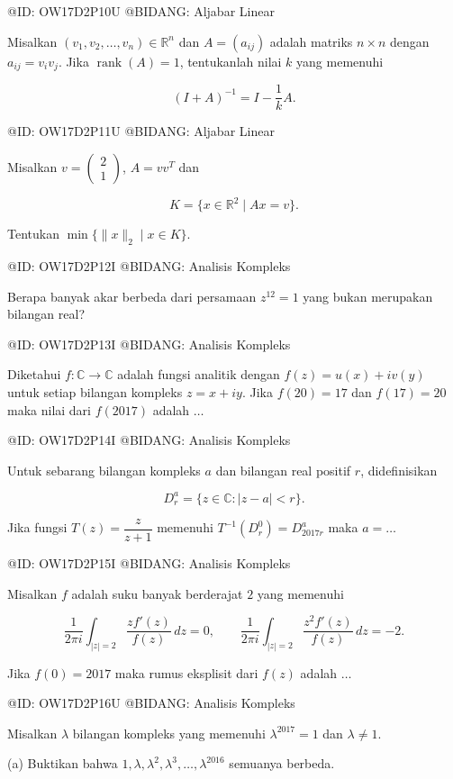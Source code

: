 @ID: OW17D2P10U
@BIDANG: Aljabar Linear

Misalkan $(v_1,v_2,\ldots,v_n)\in\mathbb R^n$ dan $A=(a_{ij})$ adalah matriks $n\times n$ dengan $a_{ij}=v_iv_j$. Jika $\operatorname{rank}(A)=1$, tentukanlah nilai $k$ yang memenuhi

$$
(I+A)^{-1}=I-\frac1k A.
$$

@ID: OW17D2P11U
@BIDANG: Aljabar Linear

Misalkan $v=\begin{pmatrix}2\\1\end{pmatrix}$, $A=vv^T$ dan

$$
K=\{x\in\mathbb R^2 \mid Ax=v\}.
$$

Tentukan $\min\{\|x\|_2 \mid x\in K\}$.

@ID: OW17D2P12I
@BIDANG: Analisis Kompleks

Berapa banyak akar berbeda dari persamaan $z^{12}=1$ yang bukan merupakan bilangan real?

@ID: OW17D2P13I
@BIDANG: Analisis Kompleks

Diketahui $f:\mathbb C\to\mathbb C$ adalah fungsi analitik dengan $f(z)=u(x)+iv(y)$ untuk setiap bilangan kompleks $z=x+iy$. Jika $f(20)=17$ dan $f(17)=20$ maka nilai dari $f(2017)$ adalah $\ldots$

@ID: OW17D2P14I
@BIDANG: Analisis Kompleks

Untuk sebarang bilangan kompleks $a$ dan bilangan real positif $r$, didefinisikan

$$
D_r^a=\{z\in\mathbb C : |z-a|<r\}.
$$

Jika fungsi $T(z)=\dfrac{z}{z+1}$ memenuhi $T^{-1}(D_r^0)=D_{2017r}^a$ maka $a=\ldots$

@ID: OW17D2P15I
@BIDANG: Analisis Kompleks

Misalkan $f$ adalah suku banyak berderajat $2$ yang memenuhi

$$
\frac{1}{2\pi i}\int_{|z|=2}\frac{zf'(z)}{f(z)}\,dz=0,\qquad \frac{1}{2\pi i}\int_{|z|=2}\frac{z^2f'(z)}{f(z)}\,dz=-2.
$$

Jika $f(0)=2017$ maka rumus eksplisit dari $f(z)$ adalah $\ldots$

@ID: OW17D2P16U
@BIDANG: Analisis Kompleks

Misalkan $\lambda$ bilangan kompleks yang memenuhi $\lambda^{2017}=1$ dan $\lambda\neq 1$.

(a) Buktikan bahwa $1,\lambda,\lambda^2,\lambda^3,\ldots,\lambda^{2016}$ semuanya berbeda.

